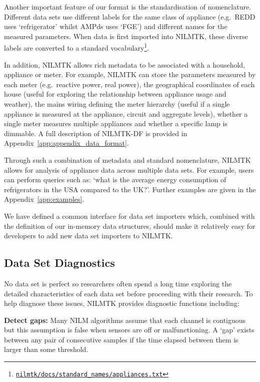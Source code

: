 \documentclass{sig-alternate}
\newcommand{\appref}[1]{Appendix~\ref{#1}}
\begin{document}
Another important feature of our format is the standardisation of nomenclature.  Different data sets use different labels for the same class of appliance (e.g.\ REDD uses `refrigerator' whilst AMPds uses `FGE') and different names for the measured parameters.  When data is first imported into NILMTK, these diverse labels are converted to a standard vocabulary\footnote{\href{https://github.com/nilmtk/nilmtk/blob/master/docs/standard_names/appliances.txt}{\texttt{nilmtk/docs/standard\_names/appliances.txt}}}.

In addition, NILMTK allows rich metadata to be associated with a
household, appliance or meter.  For example, NILMTK can store the
parameters measured by each meter (e.g.\ reactive power, real power),
the geographical coordinates of each house (useful for exploring the
relationship between appliance usage and weather), the mains wiring
defining the meter hierarchy (useful if a single appliance is measured
at the appliance, circuit and aggregate levels), whether a single
meter measures multiple appliances and whether a specific lamp is
dimmable. A full description of NILMTK-DF is provided in
\appref{app:appendix_data_format}.

Through such a combination of metadata and standard nomenclature, NILMTK allows for analysis of appliance data across multiple data sets. For example, users can perform queries such as:
`what is the average energy consumption of refrigerators in the USA
compared to the UK?'. Further examples are given in the
Appendix~\ref{app:examples}.

We have defined a common interface for data set importers
which, combined with the definition of our in-memory data structures,
should make it relatively easy for developers to add new data set
importers to NILMTK.

\subsection{Data Set Diagnostics}

\label{sec:stats_definitions}

\noindent
No data set is perfect so researchers often spend a long
time exploring the detailed characteristics of each data set before
proceeding with their research.  To help diagnose these issues, NILMTK
provides diagnostic functions including:

\textbf{Detect gaps:} Many NILM algorithms assume that each channel is
contiguous but this assumption is false when sensors are off or
malfunctioning.  A `gap' exists between any pair of consecutive
samples if the time elapsed between them is larger than
some threshold.
\end{document}
